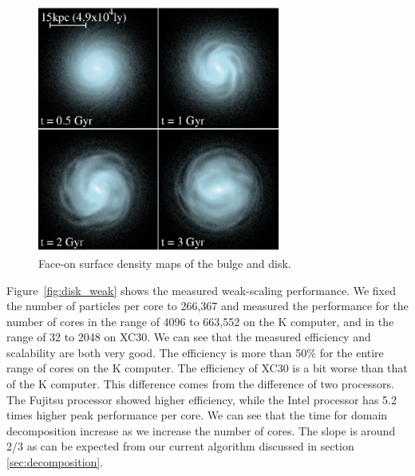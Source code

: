 \begin{figure}
  \begin{center}
    \includegraphics[width=8cm]{figure/disk.eps}
  \end{center}
  \caption{
  Face-on surface density maps of the bulge and disk.
  }
  \label{fig:evolutiondisk}
\end{figure}

Figure~\ref{fig:disk_weak} shows the measured weak-scaling
performance. We fixed the number of particles per core to 266,367 and
measured the performance for the number of cores in the range of 4096
to 663,552 on the K computer, and in the range of 32 to 2048 on
XC30. We can see that the measured efficiency and scalability are both
very good. The efficiency is more than 50\% for the entire range of
cores on the K computer. The efficiency of XC30 is a bit worse than
that of the K computer. This difference comes from the difference of
two processors. The Fujitsu processor showed higher efficiency, while
the Intel processor has 5.2 times higher peak performance per core. We
can see that the time for domain decomposition increase as we increase
the number of cores. The slope is around 2/3 as can be expected from
our current algorithm discussed in section \ref{sec:decomposition}.


